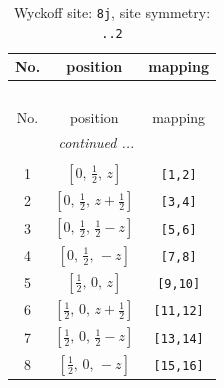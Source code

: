 \documentclass[fleqn,8pt]{jsarticle}
\begin{document}
\begin{longtable}{ccc}
\caption{Wyckoff site: {\tt 8j}, site symmetry: {\tt ..2}}
 \\
 \hline \hline
No. & position & mapping \\ \hline \endfirsthead

\multicolumn{2}{l}{\tablename\ \thetable{}} \\
 \hline \hline
No. & position & mapping \\ \hline \endhead

 \hline \hline
\multicolumn{2}{r}{\footnotesize\it continued ...} \\ \endfoot

 \hline \hline
\multicolumn{2}{r}{} \\ \endlastfoot

1 & $\left[ 0,\, \frac{1}{2},\, z \right]$ & {\tt [1,2]} \\ \hline
2 & $\left[ 0,\, \frac{1}{2},\, z + \frac{1}{2} \right]$ & {\tt [3,4]} \\ \hline
3 & $\left[ 0,\, \frac{1}{2},\, \frac{1}{2} - z \right]$ & {\tt [5,6]} \\ \hline
4 & $\left[ 0,\, \frac{1}{2},\, - z \right]$ & {\tt [7,8]} \\ \hline
5 & $\left[ \frac{1}{2},\, 0,\, z \right]$ & {\tt [9,10]} \\ \hline
6 & $\left[ \frac{1}{2},\, 0,\, z + \frac{1}{2} \right]$ & {\tt [11,12]} \\ \hline
7 & $\left[ \frac{1}{2},\, 0,\, \frac{1}{2} - z \right]$ & {\tt [13,14]} \\ \hline
8 & $\left[ \frac{1}{2},\, 0,\, - z \right]$ & {\tt [15,16]} \\
\end{longtable}
\renewcommand{\arraystretch}{1.2}
\end{document}
